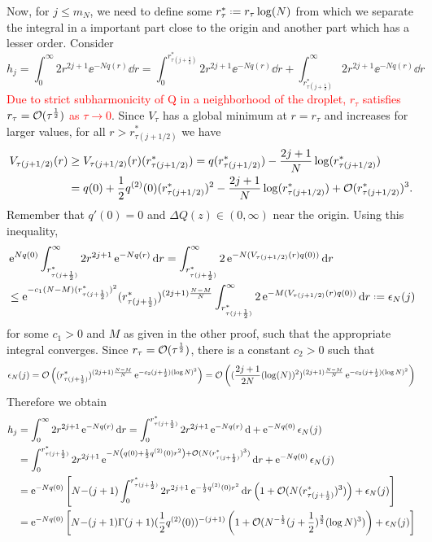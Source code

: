 Now, for $j \leq m_N$, we need to define some $r^*_\tau \deff r_\tau \log(N)$ from which we separate the integral in a important part close to the origin and another part which has a lesser order. Consider
\begin{equation}
h_j = \int_{0}^{\infty} 2r^{2j+1} \ee^{-N q(r)} \dd r =\int_{0}^{r^*_{\tau(j+\frac{1}{2})}} 2r^{2j+1} \ee^{-N q(r)} \dd r + \int_{r^*_{\tau(j+\frac{1}{2})}}^{\infty} 2r^{2j+1} \ee^{-N q(r)} \dd r
\end{equation}
\textcolor{red}{Due to strict subharmonicity of Q in a neighborhood of the droplet, $r_\tau$ satisfies $r_\tau = \mathcal{O} (\tau^{\frac{1}{2}})$ as $\tau \rightarrow 0$}. Since $V_\tau$ has a global minimum at $r = r_\tau$ and increases for larger values, for all $r > r^*_{\tau(j + 1/2)}$ we have
\begin{align}
	V_{\tau(j+1/2)}(r) & \geq V_{\tau(j+1/2)}(r)(r^*_{\tau(j+1/2)}) = q(r^*_{\tau(j+1/2)}) - \frac{2j + 1}{N} \log(r^*_{\tau(j+1/2)}) \\
	& = q(0) + \frac{1}{2} q^{(2)}(0)(r^*_{\tau(j+1/2)})^2 - \frac{2j + 1}{N} \log(r^*_{\tau(j+1/2)}) + \mathcal{O}(r^*_{\tau(j+1/2)})^3.
\end{align}
Remember that $q'(0) = 0$ and $\Delta Q(z) \in (0, \infty)$ near the origin. Using this inequality,
\begin{align}
	& \ee^{N q(0)} \int_{r^*_{\tau(j+\frac{1}{2})}}^{\infty} 2r^{2j+1} \ee^{-N q(r)} \dd r = \int_{r^*_{\tau(j+\frac{1}{2})}}^{\infty} 2 \ee^{-N (V_{\tau(j+1/2)}(r) q(0))} \dd r \\
	& \leq \ee^{-c_1 (N-M) (r^*_{\tau(j+\frac{1}{2})})^2} (r^*_{\tau(j+\frac{1}{2})})^{(2j+1) \frac{N-M}{N}} \int_{r^*_{\tau(j+\frac{1}{2})}}^{\infty} 2 \ee^{-M (V_{\tau(j+1/2)}(r) q(0))} \dd r \deff \epsilon_N(j)
\end{align}
for some $c_1 > 0$ and $M$ as given in the other proof, such that the appropriate integral converges. Since $r_\tau = \mathcal{O}(\tau^{\frac{1}{2}})$, there is a constant $c_2 > 0$ such that
\begin{equation}
	\epsilon_N(j) = \mathcal{O}\left( (r^*_{\tau(j+\frac{1}{2})})^{(2j+1) \frac{N-M}{N}} \operatorname{e}^{-c_2 (j + \frac{1}{2}) (\log N)^2} \right) = \mathcal{O}\left( (\frac{2j+1}{2N} (\log(N))^2)^{(2j+1) \frac{N-M}{N}} \operatorname{e}^{-c_2 (j + \frac{1}{2}) (\log N)^2} \right)
\end{equation}
Therefore we obtain
\begin{align}
	h_j & = \int_{0}^{\infty} 2r^{2j+1} \operatorname{e}^{-N q(r)} \mathrm{d} r = \int_{0}^{r^*_{\tau(j+\frac{1}{2})}} 2r^{2j+1} \operatorname{e}^{-N q(r)} \mathrm{d} + \operatorname{e}^{-N q(0)} \epsilon_N(j) \\
	& = \int_{0}^{r^*_{\tau(j+\frac{1}{2})}} 2r^{2j+1} \operatorname{e}^{-N \left( q(0) + \frac{1}{2} q^{(2)}(0) r^2 \right) + \mathcal{O}(N(r^*_{\tau(j+\frac{1}{2})})^3)} \mathrm{d}  r + \operatorname{e}^{-N q(0)} \epsilon_N(j) \\
	& =  \operatorname{e}^{-N q(0)} \left[ N{-(j+1)} \int_{0}^{r^*_{\tau(j+\frac{1}{2})}} 2r^{2j+1} \operatorname{e}^{-\frac{1}{2} q^{(2)}(0) r^2} \mathrm{d} r \left( 1 + \mathcal{O}(N(r^*_{\tau(j+\frac{1}{2})})^3) \right)+ \epsilon_N(j) \right] \\
	&=  \operatorname{e}^{-N q(0)} \left[ N{-(j+1)} \Gamma(j+1)(\frac{1}{2} q^{(2)}(0))^{-(j+1)} \left( 1 + \mathcal{O}(N^{-\frac{1}{2}} (j+\frac{1}{2})^{\frac{3}{2}} (\log N)^3) \right)+ \epsilon_N(j) \right]
\end{align}

